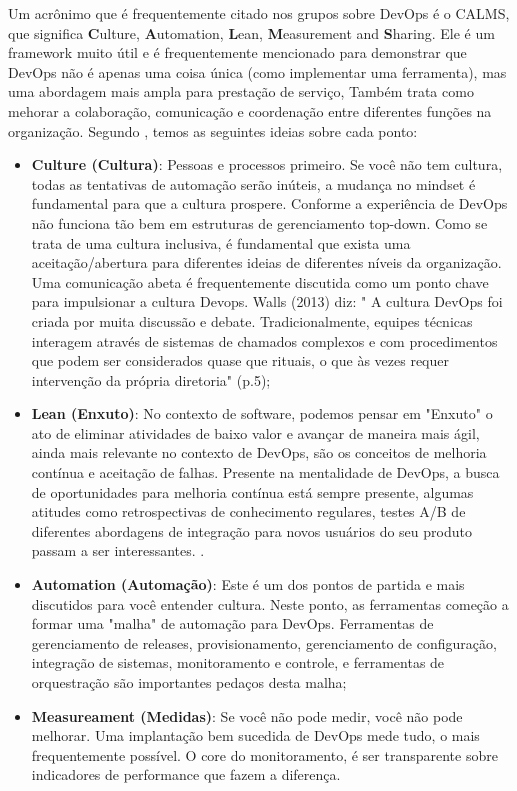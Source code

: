 \documentclass[twoside,english,brazilian]{UNISINOSartigo}
\begin{document}
Um acrônimo que é frequentemente citado nos grupos sobre DevOps é o CALMS, que significa \textbf{C}ulture, \textbf{A}utomation, \textbf{L}ean, \textbf{M}easurement and \textbf{S}haring. Ele é um framework muito útil e é frequentemente mencionado para demonstrar que DevOps não é apenas uma coisa única (como implementar uma ferramenta), mas uma abordagem mais ampla para prestação de serviço, Também trata como mehorar a colaboração, comunicação  e coordenação entre diferentes funções na organização. Segundo , temos as seguintes ideias sobre cada ponto:
\begin{itemize}
\item \textbf{Culture (Cultura)}: Pessoas e processos primeiro. Se você não tem cultura, todas as tentativas de automação serão inúteis, a mudança no mindset é fundamental para que a cultura prospere. Conforme a experiência de  DevOps não funciona tão bem em estruturas de gerenciamento top-down. Como se trata de uma cultura inclusiva, é fundamental que exista uma aceitação/abertura  para diferentes ideias de diferentes níveis da organização. Uma comunicação abeta é frequentemente discutida como um ponto chave para impulsionar a cultura Devops. Walls (2013) diz: " A cultura DevOps foi criada por muita discussão e debate. Tradicionalmente, equipes técnicas interagem através de sistemas de chamados complexos e com procedimentos que podem ser considerados quase que rituais, o que às vezes requer intervenção da própria diretoria" (p.5);
\item \textbf{Lean (Enxuto)}: No contexto de software, podemos pensar em "Enxuto" o ato de eliminar atividades de baixo valor e avançar de maneira mais ágil, ainda mais relevante no contexto de DevOps, são os conceitos de melhoria contínua e aceitação de falhas. Presente na mentalidade de DevOps, a busca de oportunidades para melhoria contínua está sempre presente, algumas atitudes como retrospectivas de conhecimento regulares, testes A/B de diferentes abordagens de integração para novos usuários do seu produto passam a ser interessantes.  \cite{Atlassian2018}.
\item \textbf{Automation (Automação)}: Este é um dos pontos de partida e mais discutidos para você entender cultura. Neste ponto, as ferramentas começão a formar uma "malha" de automação para DevOps. Ferramentas de gerenciamento de releases, provisionamento, gerenciamento de configuração, integração de sistemas, monitoramento e controle, e ferramentas de orquestração são importantes pedaços desta malha;
\item \textbf{Measureament (Medidas)}: Se você não pode medir, você não pode melhorar. Uma implantação bem sucedida de DevOps mede tudo, o mais frequentemente possível. O core do monitoramento, é ser transparente sobre indicadores de performance que fazem a diferença. 

\end{itemize}
\end{document}
